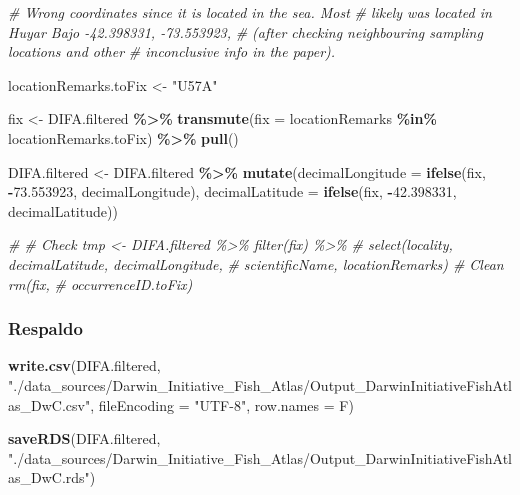 \documentclass[sn-apa,pdflatex]{sn-jnl}
\newenvironment{Shaded}{\begin{snugshade}}{\end{snugshade}}
\newcommand{\AttributeTok}[1]{\textcolor[rgb]{0.13,0.29,0.53}{#1}}
\newcommand{\CommentTok}[1]{\textcolor[rgb]{0.56,0.35,0.01}{\textit{#1}}}
\newcommand{\FloatTok}[1]{\textcolor[rgb]{0.00,0.00,0.81}{#1}}
\newcommand{\FunctionTok}[1]{\textcolor[rgb]{0.13,0.29,0.53}{\textbf{#1}}}
\newcommand{\NormalTok}[1]{#1}
\newcommand{\OtherTok}[1]{\textcolor[rgb]{0.56,0.35,0.01}{#1}}
\newcommand{\SpecialCharTok}[1]{\textcolor[rgb]{0.81,0.36,0.00}{\textbf{#1}}}
\newcommand{\StringTok}[1]{\textcolor[rgb]{0.31,0.60,0.02}{#1}}
\begin{document}
\begin{Shaded}
\begin{Highlighting}[]
\CommentTok{\# Wrong coordinates since it is located in the sea. Most}
\CommentTok{\# likely was located in Huyar Bajo {-}42.398331, {-}73.553923,}
\CommentTok{\# (after checking neighbouring sampling locations and other}
\CommentTok{\# inconclusive info in the paper).}

\NormalTok{locationRemarks.toFix }\OtherTok{\textless{}{-}} \StringTok{"U57A"}

\NormalTok{fix }\OtherTok{\textless{}{-}}\NormalTok{ DIFA.filtered }\SpecialCharTok{\%\textgreater{}\%}
    \FunctionTok{transmute}\NormalTok{(}\AttributeTok{fix =}\NormalTok{ locationRemarks }\SpecialCharTok{\%in\%}\NormalTok{ locationRemarks.toFix) }\SpecialCharTok{\%\textgreater{}\%}
    \FunctionTok{pull}\NormalTok{()}

\NormalTok{DIFA.filtered }\OtherTok{\textless{}{-}}\NormalTok{ DIFA.filtered }\SpecialCharTok{\%\textgreater{}\%}
    \FunctionTok{mutate}\NormalTok{(}\AttributeTok{decimalLongitude =} \FunctionTok{ifelse}\NormalTok{(fix, }\SpecialCharTok{{-}}\FloatTok{73.553923}\NormalTok{, decimalLongitude),}
        \AttributeTok{decimalLatitude =} \FunctionTok{ifelse}\NormalTok{(fix, }\SpecialCharTok{{-}}\FloatTok{42.398331}\NormalTok{, decimalLatitude))}

\CommentTok{\# \# Check tmp \textless{}{-} DIFA.filtered \%\textgreater{}\% filter(fix) \%\textgreater{}\%}
\CommentTok{\# select(locality, decimalLatitude, decimalLongitude,}
\CommentTok{\# scientificName, locationRemarks) \# Clean rm(fix,}
\CommentTok{\# occurrenceID.toFix)}
\end{Highlighting}
\end{Shaded}

\subsubsection{Respaldo}\label{respaldo-6}

\begin{Shaded}
\begin{Highlighting}[]
\FunctionTok{write.csv}\NormalTok{(DIFA.filtered, }\StringTok{"./data\_sources/Darwin\_Initiative\_Fish\_Atlas/Output\_DarwinInitiativeFishAtlas\_DwC.csv"}\NormalTok{,}
    \AttributeTok{fileEncoding =} \StringTok{"UTF{-}8"}\NormalTok{, }\AttributeTok{row.names =}\NormalTok{ F)}

\FunctionTok{saveRDS}\NormalTok{(DIFA.filtered, }\StringTok{"./data\_sources/Darwin\_Initiative\_Fish\_Atlas/Output\_DarwinInitiativeFishAtlas\_DwC.rds"}\NormalTok{)}
\end{Highlighting}
\end{Shaded}
\end{document}

